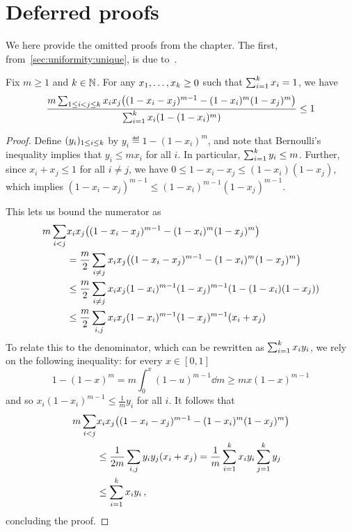 \section{Deferred proofs}
  \label{sec:deferred:chap:identity}
We here provide the omitted proofs from the chapter. The first, from~\cref{sec:uniformity:unique}, is due to~\citet{MathSE-fedja}.
\begin{lemma}
Fix $m \geq 1$ and $k \in \mathbb{N}$. For any $x_1,\dots,x_k \geq 0$ such that $\sum_{i=1}^k x_i = 1$, we have
\[
    \frac{m\sum_{1\leq i < j \leq \ab} x_i x_j \Paren{ (1-x_i - x_j)^{m-1} - (1-x_i)^m(1-x_j)^m} }{\sum_{i=1}^\ab x_i (1-(1-x_i)^m)} \leq 1
\]
\end{lemma}
\begin{proof}
Define $(y_i)_{1\leq i\leq k}$ by $y_i \eqdef 1-(1-x_i)^m$, and note that Bernoulli's inequality implies that $y_i \leq m x_i$ for all $i$. In particular, $\sum_{i=1}^k y_i \leq m$. Further, since $x_i + x_j \leq 1$ for all $i\neq j$, we have $0 \leq 1-x_i -x_j \leq (1-x_i)(1-x_j)$, which implies $(1-x_i -x_j)^{m-1} \leq (1-x_i)^{m-1}(1-x_j)^{m-1}$.

This lets us bound the numerator as
\begin{align*}
m\sum_{i < j} &x_i x_j \Paren{ (1-x_i - x_j)^{m-1} - (1-x_i)^m(1-x_j)^m} \\
&= \frac{m}{2}\sum_{i \neq j} x_i x_j \Paren{ (1-x_i - x_j)^{m-1} - (1-x_i)^m(1-x_j)^m} \\
&\leq \frac{m}{2}\sum_{i \neq j} x_i x_j (1-x_i)^{m-1}(1-x_j)^{m-1} \Paren{ 1 - (1-x_i)(1-x_j)} \\
&\leq \frac{m}{2}\sum_{i, j} x_i x_j (1-x_i)^{m-1}(1-x_j)^{m-1} \Paren{x_i+x_j}
\end{align*}
To relate this to the denominator, which can be rewritten as $\sum_{i=1}^k x_i y_i$, we rely on the following inequality: for every $x\in[0,1]$
\[
1-(1-x)^m = m\int_{0}^x (1-u)^{m-1} \dd{m} \geq m x (1-x)^{m-1}
\]
and so $x_i (1-x_i)^{m-1} \leq \frac{1}{m}y_i$ for all $i$. It follows that
\begin{align*}
m\sum_{i < j} &x_i x_j \Paren{ (1-x_i - x_j)^{m-1} - (1-x_i)^m(1-x_j)^m} \\
&\leq \frac{1}{2m}\sum_{i, j} y_i y_j \Paren{x_i+x_j} 
= \frac{1}{m}\sum_{i=1}^\ab x_i y_i \sum_{j=1}^\ab y_j \\
&\leq \sum_{i=1}^\ab x_i y_i\,,
\end{align*}
concluding the proof.
\end{proof}


